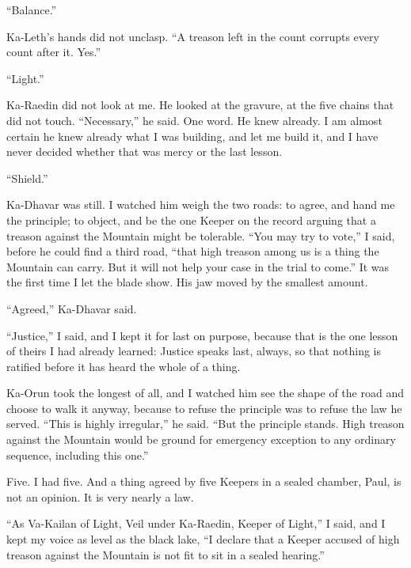 ``Balance.''\par

Ka-Leth's hands did not unclasp. ``A treason left in the count corrupts every count after it. Yes.''\par

``Light.''\par

Ka-Raedin did not look at me. He looked at the gravure, at the five chains that did not touch. ``Necessary,'' he said. One word. He knew already. I am almost certain he knew already what I was building, and let me build it, and I have never decided whether that was mercy or the last lesson.\par

``Shield.''\par

Ka-Dhavar was still. I watched him weigh the two roads: to agree, and hand me the principle; to object, and be the one Keeper on the record arguing that a treason against the Mountain might be tolerable. ``You may try to vote,'' I said, before he could find a third road, ``that high treason among us is a thing the Mountain can carry. But it will not help your case in the trial to come.'' It was the first time I let the blade show. His jaw moved by the smallest amount.\par

``Agreed,'' Ka-Dhavar said.\par

``Justice,'' I said, and I kept it for last on purpose, because that is the one lesson of theirs I had already learned: Justice speaks last, always, so that nothing is ratified before it has heard the whole of a thing.\par

Ka-Orun took the longest of all, and I watched him see the shape of the road and choose to walk it anyway, because to refuse the principle was to refuse the law he served. ``This is highly irregular,'' he said. ``But the principle stands. High treason against the Mountain would be ground for emergency exception to any ordinary sequence, including this one.''\par
 
Five. I had five. And a thing agreed by five Keepers in a sealed chamber, Paul, is not an opinion. It is very nearly a law.\par
 
``As Va-Kailan of Light, Veil under Ka-Raedin, Keeper of Light,'' I said, and I kept my voice as level as the black lake, ``I declare that a Keeper accused of high treason against the Mountain is not fit to sit in a sealed hearing.''\par
 
